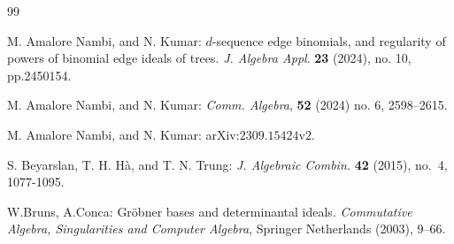 \documentclass[11pt,a4paper,reqno]{amsart}
\theoremstyle{definition}
\numberwithin{equation}{section}
\begin{document}
\vspace{2mm}







\begin{thebibliography}{99}
{

 M. Amalore Nambi, and N. Kumar: $d$-sequence edge binomials, and regularity of powers of binomial edge ideals of trees. \emph{J. Algebra Appl}. {\bf 23} (2024), no. 10, pp.2450154.

 M. Amalore Nambi, and N. Kumar:  {\emph{Comm. Algebra}}, {\bf 52} (2024) no. 6, 2598–2615.

 M. Amalore Nambi, and N. Kumar:  {arXiv:$2309.15424$v$2$.}








 S. Beyarslan, T. H. H\`a, and T. N. Trung:  \emph{J. Algebraic Combin.} {\bf 42} (2015), no.~4, 1077-1095.

 W.Bruns, A.Conca: \newblock Gr\"obner bases and determinantal ideals. \emph{Commutative Algebra, Singularities and
Computer Algebra}, Springer Netherlands (2003), 9--66.







}
\end{thebibliography}
\end{document}
